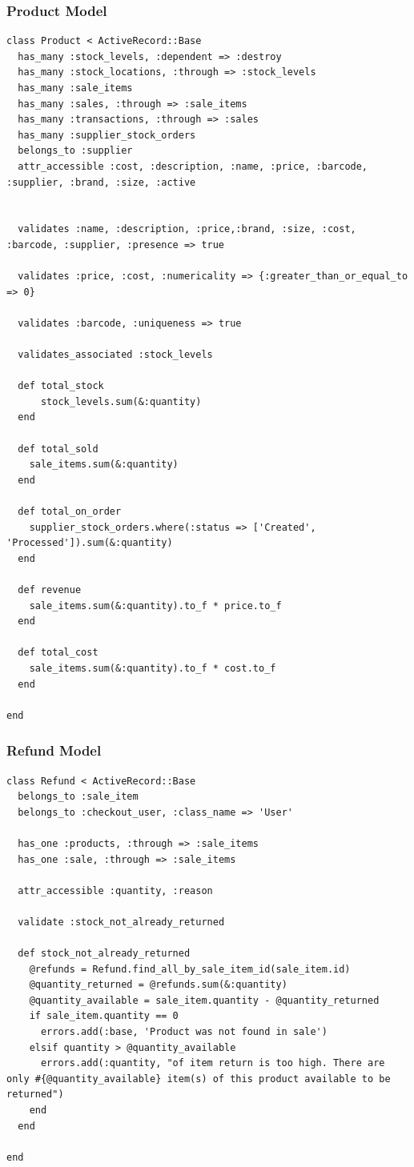 \documentclass[a4paper]{article}
\begin{document}
\subsubsection{Product Model}
\begin{verbatim}
class Product < ActiveRecord::Base
  has_many :stock_levels, :dependent => :destroy
  has_many :stock_locations, :through => :stock_levels
  has_many :sale_items
  has_many :sales, :through => :sale_items
  has_many :transactions, :through => :sales
  has_many :supplier_stock_orders
  belongs_to :supplier
  attr_accessible :cost, :description, :name, :price, :barcode, :supplier, :brand, :size, :active


  validates :name, :description, :price,:brand, :size, :cost, :barcode, :supplier, :presence => true

  validates :price, :cost, :numericality => {:greater_than_or_equal_to => 0}

  validates :barcode, :uniqueness => true

  validates_associated :stock_levels

  def total_stock
      stock_levels.sum(&:quantity)
  end

  def total_sold
    sale_items.sum(&:quantity)
  end

  def total_on_order
    supplier_stock_orders.where(:status => ['Created', 'Processed']).sum(&:quantity)
  end

  def revenue
    sale_items.sum(&:quantity).to_f * price.to_f
  end

  def total_cost
    sale_items.sum(&:quantity).to_f * cost.to_f
  end

end

\end{verbatim}

\subsubsection{Refund Model}
\begin{verbatim}
class Refund < ActiveRecord::Base
  belongs_to :sale_item
  belongs_to :checkout_user, :class_name => 'User'
  
  has_one :products, :through => :sale_items
  has_one :sale, :through => :sale_items
  
  attr_accessible :quantity, :reason
  
  validate :stock_not_already_returned
  
  def stock_not_already_returned
    @refunds = Refund.find_all_by_sale_item_id(sale_item.id)
    @quantity_returned = @refunds.sum(&:quantity)
    @quantity_available = sale_item.quantity - @quantity_returned
    if sale_item.quantity == 0
      errors.add(:base, 'Product was not found in sale')
    elsif quantity > @quantity_available
      errors.add(:quantity, "of item return is too high. There are only #{@quantity_available} item(s) of this product available to be returned")
    end
  end
  
end

\end{verbatim}
\end{document}
